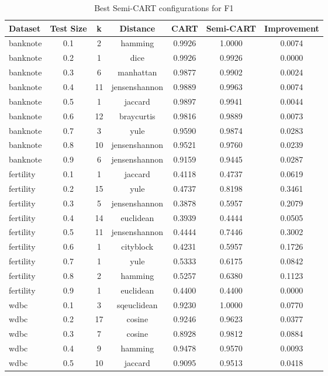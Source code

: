 \begin{table}[ht]
\centering
\caption{Best Semi-CART configurations for F1}
\begin{tabular}{lcccccc}
\hline
Dataset & Test Size & k & Distance & CART & Semi-CART & Improvement \\ \hline
banknote & 0.1 & 2 & hamming & 0.9926 & 1.0000 & 0.0074 \\
banknote & 0.2 & 1 & dice & 0.9926 & 0.9926 & 0.0000 \\
banknote & 0.3 & 6 & manhattan & 0.9877 & 0.9902 & 0.0024 \\
banknote & 0.4 & 11 & jensenshannon & 0.9889 & 0.9963 & 0.0074 \\
banknote & 0.5 & 1 & jaccard & 0.9897 & 0.9941 & 0.0044 \\
banknote & 0.6 & 12 & braycurtis & 0.9816 & 0.9889 & 0.0073 \\
banknote & 0.7 & 3 & yule & 0.9590 & 0.9874 & 0.0283 \\
banknote & 0.8 & 10 & jensenshannon & 0.9521 & 0.9760 & 0.0239 \\
banknote & 0.9 & 6 & jensenshannon & 0.9159 & 0.9445 & 0.0287 \\
fertility & 0.1 & 1 & jaccard & 0.4118 & 0.4737 & 0.0619 \\
fertility & 0.2 & 15 & yule & 0.4737 & 0.8198 & 0.3461 \\
fertility & 0.3 & 5 & jensenshannon & 0.3878 & 0.5957 & 0.2079 \\
fertility & 0.4 & 14 & euclidean & 0.3939 & 0.4444 & 0.0505 \\
fertility & 0.5 & 11 & jensenshannon & 0.4444 & 0.7446 & 0.3002 \\
fertility & 0.6 & 1 & cityblock & 0.4231 & 0.5957 & 0.1726 \\
fertility & 0.7 & 1 & yule & 0.5333 & 0.6175 & 0.0842 \\
fertility & 0.8 & 2 & hamming & 0.5257 & 0.6380 & 0.1123 \\
fertility & 0.9 & 1 & euclidean & 0.4400 & 0.4400 & 0.0000 \\
wdbc & 0.1 & 3 & sqeuclidean & 0.9230 & 1.0000 & 0.0770 \\
wdbc & 0.2 & 17 & cosine & 0.9246 & 0.9623 & 0.0377 \\
wdbc & 0.3 & 7 & cosine & 0.8928 & 0.9812 & 0.0884 \\
wdbc & 0.4 & 9 & hamming & 0.9478 & 0.9570 & 0.0093 \\
wdbc & 0.5 & 10 & jaccard & 0.9095 & 0.9513 & 0.0418 \\

\end{tabular}
\end{table}
